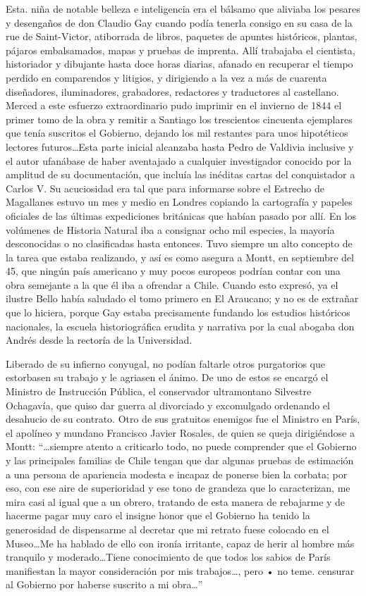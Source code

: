 \documentclass[10pt,twoside,openright]{memoir}
\begin{document}
Esta. niña de notable belleza e inteligencia era el bálsamo que aliviaba
los pesares y desengaños de don Claudio Gay cuando podía tenerla consigo
en su casa de la rue de Saint-Victor, atiborrada de libros, paquetes de
apuntes históricos, plantas, pájaros embalsamados, mapas y pruebas de
imprenta. Allí trabajaba el cientista, historiador y dibujante hasta
doce horas diarias, afanado en recuperar el tiempo perdido en
comparendos y litigios, y dirigiendo a la vez a más de cuarenta
diseñadores, iluminadores, grabadores, redactores y traductores al
castellano. Merced a este esfuerzo extraordinario pudo imprimir en el
invierno de 1844 el primer tomo de la obra y remitir a Santiago los
trescientos cincuenta ejemplares que tenía suscritos el Gobierno,
dejando los mil restantes para unos hipotéticos lectores futuros\ldots Esta
parte inicial alcanzaba hasta Pedro de Valdivia inclusive y el autor
ufanábase de haber aventajado a cualquier investigador conocido por la
amplitud de su documentación, que incluía las inéditas cartas del
conquistador a Carlos V. Su acuciosidad era tal que para informarse
sobre el Estrecho de Magallanes estuvo un mes y medio en Londres
copiando la cartografía y papeles oficiales de las últimas expediciones
británicas que habían pasado por allí. En los volúmenes de Historia
Natural iba a consignar ocho mil especies, la mayoría desconocidas o no
clasificadas hasta entonces. Tuvo siempre un alto concepto de la tarea
que estaba realizando, y así es como asegura a Montt, en septiembre del
45, que ningún país americano y muy pocos europeos podrían contar con
una obra semejante a la que él iba a ofrendar a Chile. Cuando esto
expresó, ya el ilustre Bello había saludado el tomo primero en El
Araucano; y no es de extrañar que lo hiciera, porque Gay estaba
precisamente fundando los estudios históricos nacionales, la escuela
historiográfica erudita y narrativa por la cual abogaba don Andrés desde
la rectoría de la Universidad.

Liberado de su infierno conyugal, no podían faltarle otros purgatorios
que estorbasen su trabajo y le agriasen el ánimo. De uno de estos se
encargó el Ministro de Instrucción Pública, el conservador ultramontano
Silvestre Ochagavía, que quiso dar guerra al divorciado y excomulgado
ordenando el desahucio de su contrato. Otro de sus gratuitos enemigos
fue el Ministro en París, el apolíneo y mundano Francisco Javier
Rosales, de quien se queja dirigiéndose a Montt: ``\ldots siempre atento a
criticarlo todo, no puede comprender que el Gobierno y las principales
familias de Chile tengan que dar algunas pruebas de estimación a una
persona de apariencia modesta e incapaz de ponerse bien la corbata; por
eso, con ese aire de superioridad y ese tono de grandeza que lo
caracterizan, me mira casi al igual que a un obrero, tratando de esta
manera de rebajarme y de hacerme pagar muy caro el insigne honor que el
Gobierno ha tenido la generosidad de dispensarme al decretar que mi
retrato fuese colocado en el Museo\ldots Me ha hablado de ello con ironía
irritante, capaz de herir al hombre más tranquilo y moderado\ldots Tiene
conocimiento de que todos los sabios de París manifiestan la mayor
consideración por mis trabajos\ldots, pero • no teme. censurar al Gobierno
por haberse suscrito a mi obra\ldots''
\end{document}
